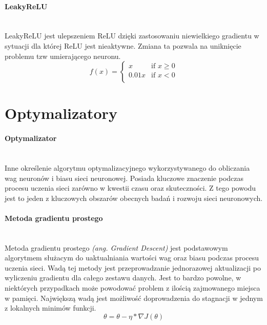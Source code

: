 \paragraph{LeakyReLU} \mbox{}\\
LeakyReLU jest ulepszeniem ReLU dzięki zastosowaniu niewielkiego gradientu w sytuacji
dla której ReLU jest nieaktywne. Zmiana ta pozwala na uniknięcie problemu tzw
umierającego neuronu.
\begin{equation}
f(x) =
\begin{cases}
 x & \text{if } x \geqslant 0 \\
 0.01x & \text{if } x < 0 \\
\end{cases}
\end{equation}

\section{Optymalizatory}
\paragraph{Optymalizator} \mbox{}\\
Inne określenie algorytmu optymalizacyjnego wykorzystywanego do obliczania wag neuronów
i biasu sieci neuronowej. Posiada kluczowe znaczenie podczas procesu uczenia sieci
zarówno w kwestii czasu oraz skuteczności. Z tego powodu jest to jeden z kluczowych
obszarów obecnych badań i rozwoju sieci neuronowych.

\paragraph{Metoda gradientu prostego} \mbox{}\\
Metoda gradientu prostego \textit{(ang. Gradient Descent)} jest podstawowym algorytmem
służacym do uaktualniania wartości wag oraz biasu podczas procesu uczenia sieci. Wadą tej
metody jest przeprowadzanie jednorazowej aktualizacji po wyliczeniu gradientu dla
całego zestawu danych. Jest to bardzo powolne, w niektórych przypadkach może powodować
problem z ilością zajmowanego miejsca w pamięci. Największą wadą jest możliwość doprowadzenia
do stagnacji w jednym z lokalnych minimów funkcji.
\begin{equation}
\theta = \theta - \eta * \nabla J(\theta)
\end{equation}

